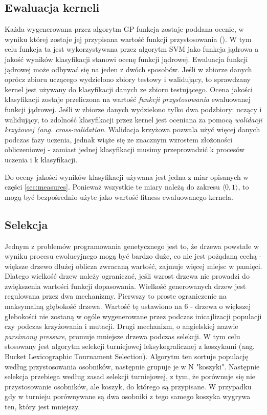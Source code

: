 \subsection{Ewaluacja kerneli}\label{sec:ewaluacja}
Każda wygenerowana przez algorytm GP funkcja zostaje poddana ocenie, w wyniku której zostaje jej przypisana wartość funkcji przystosowania (). W tym celu funkcja ta jest wykorzystywana przez algorytm SVM jako funkcja jądrowa a jakość wyników klasyfikacji stanowi ocenę funkcji jądrowej.
Ewaluacja funkcji jądrowej może odbywać się na jeden z dwóch sposobów. Jeśli w zbiorze danych oprócz zbioru uczącego wydzielono zbiory testowy i walidujący, to sprawdzany kernel jest używany do klasyfikacji danych ze zbioru testującego. Ocena jakości klasyfikacji zostaje przeliczona na wartość \textit{ funkcji przystosowania} ewaluowanej funkcji jądrowej.
Jeśli w zbiorze danych wydzielono tylko dwa podzbiory: uczący i walidujący, to zdolność klasyfikacji przez kernel jest oceniana za pomocą \textit{walidacji krzyżowej (ang. cross-validation}.
Walidacja krzyżowa pozwala użyć więcej danych podczas fazy uczenia, jednak wiąże się ze znacznym wzrostem złożoności obliczeniowej - zamiast jednej klasyfikacji musimy przeprowadzić k procesów uczenia i k klasyfikacji.

Do oceny jakości wyników klasyfikacji używana jest jedna z miar opisanych w części \ref{sec:measures}. Ponieważ wszystkie te miary należą do zakresu $ \langle 0,1 \rangle $, to mogą być bezpośrednio użyte jako wartość fitness ewaluowanego kernela.

\subsection{Selekcja}
Jednym z problemów programowania genetycznego jest to, że drzewa powstałe w wyniku procesu ewolucyjnego mogą być bardzo duże, co nie jest pożądaną cechą - większe drzewo dłużej oblicza zwracaną wartość, zajmuje więcej miejsc w pamięci. Dlatego wielkość drzew należy ograniczać, jeśli wzrost drzewa nie prowadzi do zwiększenia wartości funkcji dopasowania.
Wielkość generowanych drzew jest regulowana przez dwa mechanizmy. Pierwszy to proste ograniczenie na maksymalną głębokość drzewa. Wartość tę ustawiono na 6 - drzewa o większej głebokości nie zostaną w ogóle wygenerowane przez podczas inicajlizacji populacji czy podczas krzyżowania i mutacji. Drugi mechanizm, o angielskiej nazwie \textit{parsimony pressure},  promuje mniejsze drzewa podczas selekcji. W tym celu stosowany jest algorytm selekcji turniejowej leksykograficznej z koszykami (ang. Bucket Lexicographic
 Tournament Selection). Algorytm ten sortuje populację według przystosowania osobników, następnie grupuje je w N "koszyki". Następnie selekcja przebiega według zasad selekcji turniejowej, z tym, że porównuje się nie przystosowanie osobników, ale koszyk, do którego są przypisane. W przypadku gdy w turnieju porównywane są dwa osobniki z tego samego koszyka wygrywa ten, który jest mniejszy.

